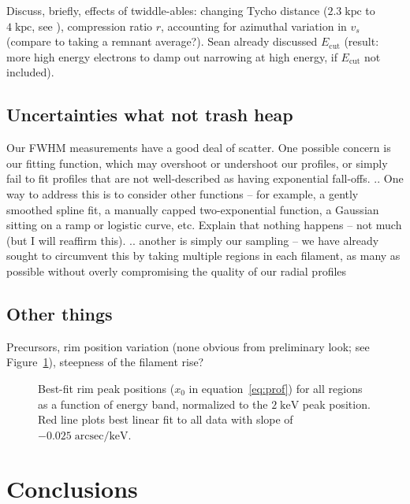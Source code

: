 \documentclass[iop, apj, numberedappendix, twocolappendix]{emulateapj}
\newcommand*{\mt}{\mathrm}
\newcommand*{\unit}[1]{\;\mt{#1}}  %
\newcommand*{\Ecut}{E_{\mt{cut}}}
\begin{document}
Discuss, briefly, effects of twiddle-ables: changing Tycho distance ($2.3
\unit{kpc}$ to $4 \unit{kpc}$, see \citet{hayato2010}), compression ratio $r$,
accounting for azimuthal variation in $v_s$ (compare to taking a remnant
average?).  Sean already discussed $\Ecut$ (result: more high energy electrons
to damp out narrowing at high energy, if $\Ecut$ not included).

\subsection{Uncertainties what not trash heap}

Our FWHM measurements have a good deal of scatter.
One possible concern is our fitting function, which may overshoot or undershoot
our profiles, or simply fail to fit profiles that are not well-described as
having exponential fall-offs.
.. One way to address this is to consider other functions -- for example, a
gently smoothed spline fit, a manually capped two-exponential function, a
Gaussian sitting on a ramp or logistic curve, etc.
Explain that nothing happens -- not much (but I will reaffirm this).
.. another is simply our sampling -- we have already sought to circumvent this
by taking multiple regions in each filament, as many as possible without overly
compromising the quality of our radial profiles

\subsection{Other things}

Precursors, rim position variation (none obvious from preliminary look; see
Figure~\ref{fig:peak-pos}), steepness of the filament rise?

\begin{figure}[ht]
    \centering
    \caption{Best-fit rim peak positions ($x_0$ in equation~\eqref{eq:prof})
        for all regions as a function of energy band, normalized to the $2
        \unit{keV}$ peak position.  Red line plots best linear fit to all data
        with slope of $-0.025 \unit{arcsec/keV}$.
        \label{fig:peak-pos}}
\end{figure}


\section{Conclusions}
\end{document}
